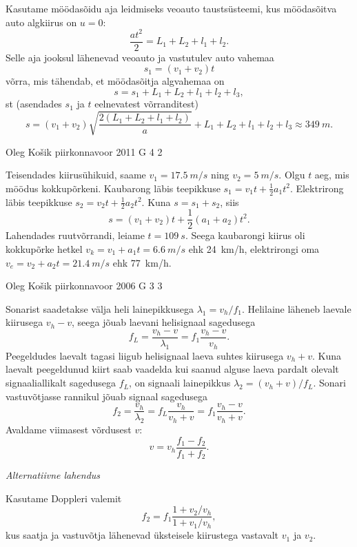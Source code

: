 \documentclass[11pt, twoside]{article}
\begin{document}
{{Kasutame möödasõidu aja leidmiseks veoauto taustsüsteemi, kus möödasõitva auto
algkiirus on $u = 0$:
\[
\frac{at^2}{2} = L_1 + L_2 + l_1 + l_2.
\]
Selle aja jooksul lähenevad veoauto ja vastutulev auto vahemaa
\[
s_1 = (v_1 + v_2)t 
\]
võrra, mis tähendab, et möödasõitja algvahemaa on
\[
s = s_1 + L_1 + L_2 + l_1 + l_2 + l_3 ,
\]
st (asendades $s_1$ ja $t$ eelnevatest võrranditest)
\[
s=\left(v_{1}+v_{2}\right) \sqrt{\frac{2\left(L_{1}+L_{2}+l_{1}+l_{2}\right)}{a}}+L_{1}+L_{2}+l_{1}+l_{2}+l_{3} \approx \SI{349}{m}.
\]
\fi
}

{Oleg Košik} %
{piirkonnavoor} %
{2011} %
{G 4} %
{2} %
{

\ifSolution
Teisendades kiirusühikuid, saame $v_1 = \SI{17,5}{m/s}$ ning $v_2 = \SI{5}{m/s}$. Olgu $t$ aeg, mis möödus kokkupõrkeni. Kaubarong läbis teepikkuse $s_1 = v_1t + \frac{1}{2}a_1t^2$. Elektrirong läbis teepikkuse $s_2 = v_2t + \frac{1}{2}a_2t^2$. Kuna $s = s_1 + s_2$, siis
\[
s=\left(v_{1}+v_{2}\right) t+\frac{1}{2}\left(a_{1}+a_{2}\right) t^{2}.
\]
Lahendades ruutvõrrandi, leiame $t = \SI{109}{s}$. Seega kaubarongi kiirus oli kokkupõrke hetkel $v_k = v_1 + a_1t = \SI{6,6}{m/s}$ ehk \SI{24}{km/h}, elektrirongi oma $v_e = v_2 + a_2t = \SI{21,4}{m/s}$ ehk \SI{77}{km/h}.
\fi
}

{Oleg Košik} %
{piirkonnavoor} %
{2006} %
{G 3} %
{3} %
{

\ifSolution
Sonarist saadetakse välja heli lainepikkusega $\lambda_1 = v_h/f_1$. Helilaine läheneb laevale kiirusega $v_h - v$, seega jõuab laevani helisignaal sagedusega
\[
f_L = \frac{v_h-v}{\lambda_1} = f_1 \frac{v_h-v}{v_h}.
\]
Peegeldudes laevalt tagasi liigub helisignaal laeva suhtes kiirusega $v_h + v$. Kuna laevalt peegeldunud kiirt saab vaadelda kui saanud alguse laeva pardalt olevalt signaaliallikalt sagedusega $f_L$, on signaali lainepikkus $\lambda_2 = (v_h+v)/f_L$. Sonari vastuvõtjasse rannikul jõuab signaal sagedusega
\[
f_{2}=\frac{v_{h}}{\lambda_{2}}=f_{L} \frac{v_{h}}{v_{h}+v}=f_{1} \frac{v_{h}-v}{v_{h}+v}.
\]
Avaldame viimasest võrdusest $v$:
\[
v = v_h \frac{f_1-f_2}{f_1+f_2}.
\]

\vspace{0.5\baselineskip}

\emph{Alternatiivne lahendus}

Kasutame Doppleri valemit
\[
f_2 = f_1 \frac{1+v_2/v_h}{1+v_1/v_h},
\]
kus saatja ja vastuvõtja lähenevad üksteisele kiirustega vastavalt $v_1$ ja $v_2$.

}}
\end{document}
